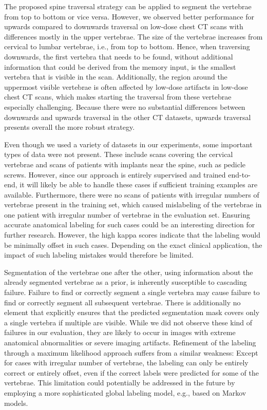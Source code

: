 \documentclass[authoryear,5p,final,times]{elsarticle}
\begin{document}
    The proposed spine traversal strategy can be applied to segment the vertebrae from top to bottom or vice versa. However, we observed better performance for upwards compared to downwards traversal on low-dose chest CT scans with differences mostly in the upper vertebrae. The size of the vertebrae increases from cervical to lumbar vertebrae, i.e., from top to bottom. Hence, when traversing downwards, the first vertebra that needs to be found, without additional information that could be derived from the memory input, is the smallest vertebra that is visible in the scan. Additionally, the region around the uppermost visible vertebrae is often affected by low-dose artifacts in low-dose chest CT scans, which makes starting the traversal from these vertebrae especially challenging. Because there were no substantial differences between downwards and upwards traversal in the other CT datasets, upwards traversal presents overall the more robust strategy.

    Even though we used a variety of datasets in our experiments, some important types of data were not present. These include scans covering the cervical vertebrae and scans of patients with implants near the spine, such as pedicle screws. However, since our approach is entirely supervised and trained end-to-end, it will likely be able to handle these cases if sufficient training examples are available. Furthermore, there were no scans of patients with irregular numbers of vertebrae present in the training set, which caused mislabeling of the vertebrae in one patient with irregular number of vertebrae in the evaluation set. Ensuring accurate anatomical labeling for such cases could be an interesting direction for further research. However, the high kappa scores indicate that the labeling would be minimally offset in such cases. Depending on the exact clinical application, the impact of such labeling mistakes would therefore be limited.

    Segmentation of the vertebrae one after the other, using information about the already segmented vertebrae as a prior, is inherently susceptible to cascading failure. Failure to find or correctly segment a single vertebra may cause failure to find or correctly segment all subsequent vertebrae. There is additionally no element that explicitly ensures that the predicted segmentation mask covers only a single vertebra if multiple are visible. While we did not observe these kind of failures in our evaluation, they are likely to occur in images with extreme anatomical abnormalities or severe imaging artifacts. Refinement of the labeling through a maximum likelihood approach suffers from a similar weakness: Except for cases with irregular number of vertebrae, the labeling can only be entirely correct or entirely offset, even if the correct labels were predicted for some of the vertebrae. This limitation could potentially be addressed in the future by employing a more sophisticated global labeling model, e.g., based on Markov models.
\end{document}
